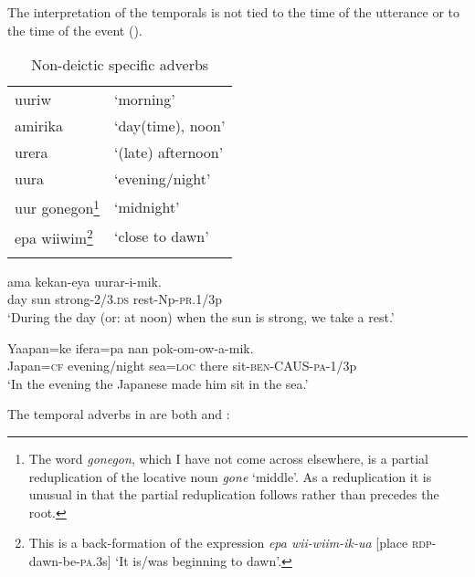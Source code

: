 The interpretation of the  temporals is not tied to the time of the utterance or to the time of the event (). 

\begin{table}
\begin{tabular}{ll}
\mytoprule
uuriw &`morning'\\
amirika &`day(time), noon'\\
urera &`(late) afternoon'\\
uura &`evening/night'\\
uur gonegon\footnote{The word \textit{gonegon}, which I have not come across elsewhere, is a partial reduplication of the locative noun \textit{gone} `middle'. As a reduplication it is unusual in that the partial reduplication follows rather than precedes the root.} &`midnight'\\
epa wiiwim\footnote{This is a back-formation of the expression \textit{epa wii-wiim-ik-ua} [place \textsc{rdp}-dawn-be-\textsc{pa}.3s] `It is/was beginning to dawn'.} &`close to dawn'\\
\mybottomrule
\end{tabular}
\caption{Non-deictic specific adverbs}
\label{tab:3:nondeicticspecific}
\end{table}

\ea%
\label{ex:x698}
\gll {} ama kekan-eya uurar-i-mik. \\
day sun strong-2/3.\textsc{ds} rest-Np-\textsc{pr}.1/3p\\
\glt`During the day (or: at noon) when the sun is strong, we take a rest.'
\z

\ea%
\label{ex:x699}
\gll Yaapan=ke  ifera=pa nan pok-om-ow-a-mik. \\
Japan=\textsc{cf} evening/night sea=\textsc{loc} there sit-\textsc{ben}-CAUS-\textsc{pa}-1/3p\\
\glt`In the evening the Japanese made him sit in the sea.'
\z

The temporal adverbs in  are both  and :

